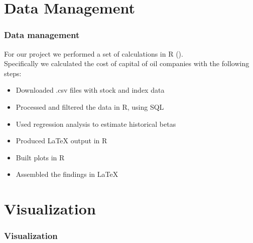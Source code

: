 \documentclass {beamer}
\begin{document}
\section{Data Management}
\begin{frame}
\frametitle{Data management}
For our project we performed a set of calculations in R ().\\
Specifically we calculated the cost of capital of oil companies with the following steps:
\begin{itemize}
\item Downloaded .csv files with stock and index data
\item Processed and filtered the data in R, using SQL
\item Used regression analysis to estimate historical betas
\item Produced LaTeX output in R
\item Built plots in R
\item Assembled the findings in LaTeX
\end{itemize}

\end{frame}

\section{Visualization}
\begin{frame}
\frametitle{Visualization}

\end{frame}
\end{document}
